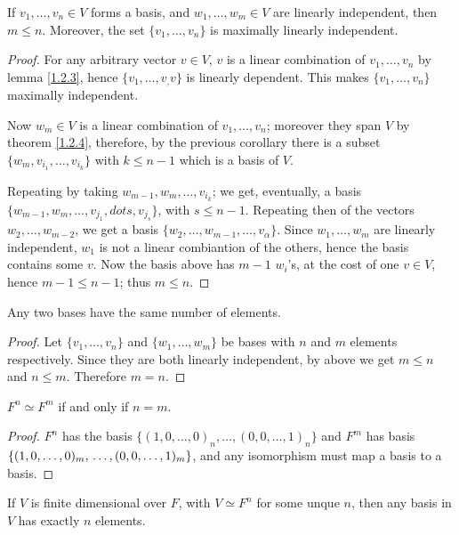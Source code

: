 \begin{lemma}\label{1.2.6}
    If $ v_1, \dots, v_n \in V$ forms a basis, and $ w_1, \dots, w_m \in V$ are
    linearly independent, then $m \leq n$. Moreover, the set $\{v_1, \dots,
    v_n\}$ is maximally linearly independent.
\end{lemma}
\begin{proof}
    For any arbitrary vector $v \in V$,  $v$ is a linear combination of  $ v_1,
    \dots, v_n$ by lemma \ref {1.2.3}, hence $\{v_1, \dots, v_,v\}$ is linearly
    dependent. This makes $\{v_1, \dots, v_n\}$ maximally independent.

    Now $w_m \in V$ is a linear combination of  $ v_1, \dots, v_n$; moreover
    they span $V$ by theorem \ref{1.2.4}, therefore, by the previous corollary
    there is a subset $\{w_m,v_{i_1}, \dots, v_{i_k}\}$ with $k \leq n-1$ which
    is a basis of  $V$.

    Repeating by taking  $w_{m-1},w_m, \dots, v_{i_k}$; we get, eventually, a
    basis $\{w_{m-1},w_m, \dots, v_{j_1}, dots, v_{j_s}\}$, with $s \leq n-1$.
    Repeating then of the vectors  $ w_2, \dots, w_{m-2}$, we get a basis
    $\{w_2,\dots, w_{m-1}, \dots, v_\alpha\}$. Since $ w_1, \dots, w_m$ are
    linearly independent, $ w_1$ is not a linear combiantion of the others,
    hence the basis contains some $v$. Now the basis above has  $m-1$  $w_i$'s,
    at the cost of one  $v \in V$, hence  $m-1 \leq n-1$; thus  $m \leq n$.
\end{proof}
\begin{corollary}
    Any two bases have the same number of elements.
\end{corollary}
\begin{proof}
    Let $\{v_1, \dots, v_n\}$ and $\{w_1, \dots, w_m\}$ be bases with $n$ and
    $m$ elements respectively. Since they are both linearly independent, by
    above we get  $m \leq n$ and  $n 
    \leq m$. Therefore  $m=n$.
\end{proof}
\begin{corollary}
    $F^n \simeq F^m$ if and only if  $n=m$.
\end{corollary}
\begin{proof}
    $F^n$ has the basis  $\{(1,0, \dots, 0)_n, \dots, (0,0, \dots, 1)_n\}$ and
    $F^m$ has basis $\{(1,0, \dots, 0)_m, \\ \dots, (0,0, \dots, 1)_m\}$, and any
    isomorphism must map a basis to a basis.
\end{proof}
\begin{corollary}
    If $V$ is finite dimensional over  $F$, with  $V \simeq F^n$ for some unque
     $n$, then  any basis in $V$ has exactly  $n$ elements.
\end{corollary}

